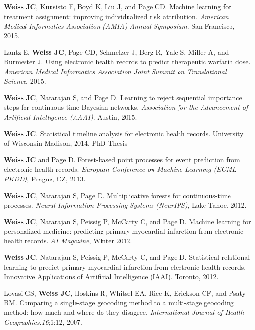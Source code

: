 \begin{bibsection}
\item  \textbf{Weiss JC}, Kuusisto F, Boyd K, Liu J, and Page CD. Machine learning for treatment assignment: improving individualized risk attribution. \textit{American Medical Informatics Association (AMIA) Annual Symposium}. San Francisco, 2015.

\item  Lantz E, \textbf{Weiss JC}, Page CD, Schmelzer J, Berg R, Yale S, Miller A, and Burmester J. Using electronic health records to predict therapeutic warfarin dose. \textit{American Medical Informatics Association Joint Summit on Translational Science}, 2015.

\item  \textbf{Weiss JC}, Natarajan S, and Page D. Learning to reject sequential importance steps for continuous-time Bayesian networks. \textit{Association for the Advancement of Artificial Intelligence (AAAI)}. Austin, 2015.

\item  \textbf{Weiss JC}. Statistical timeline analysis for electronic health records. University of Wisconsin-Madison, 2014. PhD Thesis.

\item  \textbf{Weiss JC} and Page D. Forest-based point processes for event prediction from electronic health records. \textit{European Conference on Machine Learning (ECML-PKDD)}, Prague, CZ, 2013.

\item  \textbf{Weiss JC}, Natarajan S, Page D. Multiplicative forests for continuous-time processes. \textit{Neural Information Processing Systems (NeurIPS)}, Lake Tahoe, 2012.

\item  \textbf{Weiss JC}, Natarajan S, Peissig P, McCarty C, and Page D. Machine learning for personalized medicine: predicting primary myocardial infarction from electronic health records. \textit{AI Magazine}, Winter 2012.

\item  \textbf{Weiss JC}, Natarajan S, Peissig P, McCarty C, and Page D. Statistical relational learning to predict primary myocardial infarction from electronic health records. Innovative Applications of Artificial Intelligence (IAAI). Toronto, 2012.

\item  Lovasi GS, \textbf{Weiss JC}, Hoskins R, Whitsel EA, Rice K, Erickson CF, and Psaty BM. Comparing a single-stage geocoding method to a multi-stage geocoding method: how much and where do they disagree. \textit{International Journal of Health Geographics}.\textit{16};6:12, 2007.
  
\end{bibsection}

